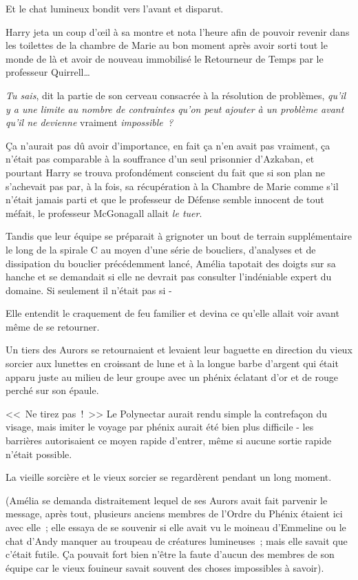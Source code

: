 Et le chat lumineux bondit vers l'avant et disparut.

Harry jeta un coup d'œil à sa montre et nota l'heure afin de pouvoir revenir dans les toilettes de la chambre de Marie au bon moment après avoir sorti tout le monde de là et avoir de nouveau immobilisé le Retourneur de Temps par le professeur Quirrell…

\emph{Tu sais}, dit la partie de son cerveau consacrée à la résolution de problèmes, \emph{qu'il y a une limite au nombre de contraintes qu'on peut ajouter à un problème avant qu'il ne devienne} vraiment \emph{impossible~?}

Ça n'aurait pas dû avoir d'importance, en fait ça n'en avait pas vraiment, ça n'était pas comparable à la souffrance d'un seul prisonnier d'Azkaban, et pourtant Harry se trouva profondément conscient du fait que si son plan ne s'achevait pas par, à la fois, sa récupération à la Chambre de Marie comme s'il n'était jamais parti et que le professeur de Défense semble innocent de tout méfait, le professeur McGonagall allait \emph{le tuer}.

\later

Tandis que leur équipe se préparait à grignoter un bout de terrain supplémentaire le long de la spirale C au moyen d'une série de boucliers, d'analyses et de dissipation du bouclier précédemment lancé, Amélia tapotait des doigts sur sa hanche et se demandait si elle ne devrait pas consulter l'indéniable expert du domaine. Si seulement il n'était pas si -

Elle entendit le craquement de feu familier et devina ce qu'elle allait voir avant même de se retourner.

Un tiers des Aurors se retournaient et levaient leur baguette en direction du vieux sorcier aux lunettes en croissant de lune et à la longue barbe d'argent qui était apparu juste au milieu de leur groupe avec un phénix éclatant d'or et de rouge perché sur son épaule.

<<~Ne tirez pas~!~>> Le Polynectar aurait rendu simple la contrefaçon du visage, mais imiter le voyage par phénix aurait été bien plus difficile - les barrières autorisaient ce moyen rapide d'entrer, même si aucune sortie rapide n'était possible.

La vieille sorcière et le vieux sorcier se regardèrent pendant un long moment.

(Amélia se demanda distraitement lequel de ses Aurors avait fait parvenir le message, après tout, plusieurs anciens membres de l'Ordre du Phénix étaient ici avec elle~; elle essaya de se souvenir si elle avait vu le moineau d'Emmeline ou le chat d'Andy manquer au troupeau de créatures lumineuses~; mais elle savait que c'était futile. Ça pouvait fort bien n'être la faute d'aucun des membres de son équipe car le vieux fouineur savait souvent des choses impossibles à savoir).

